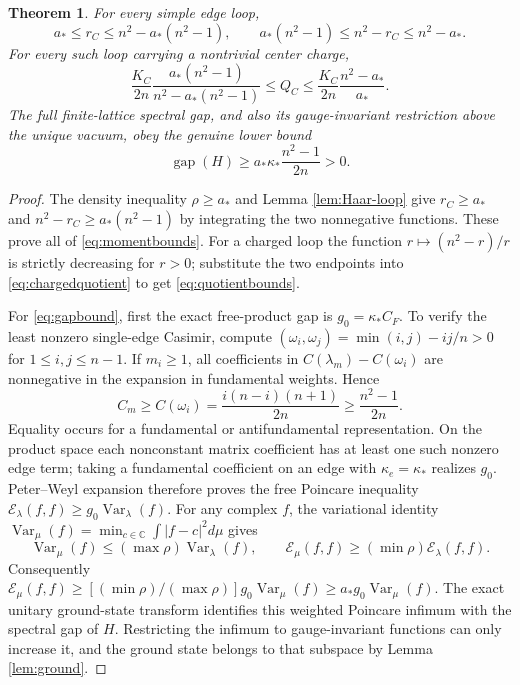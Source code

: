 \documentclass[11pt]{article}
\newtheorem{theorem}{Theorem}
\theoremstyle{definition}
\newcommand{\Var}{\operatorname{Var}}
\begin{document}
\begin{theorem}\label{thm:finite-bounds}
For every simple edge loop,
\begin{equation}\label{eq:momentbounds}
 a_*\leq r_C\leq n^2-a_*(n^2-1),\qquad
 a_*(n^2-1)\leq n^2-r_C\leq n^2-a_*.
\end{equation}
For every such loop carrying a nontrivial center charge,
\begin{equation}\label{eq:quotientbounds}
 \frac{K_C}{2n}\frac{a_*(n^2-1)}{n^2-a_*(n^2-1)}
 \leq Q_C\leq
 \frac{K_C}{2n}\frac{n^2-a_*}{a_*}.
\end{equation}
The full finite-lattice spectral gap, and also its gauge-invariant
restriction above the unique vacuum, obey the genuine lower bound
\begin{equation}\label{eq:gapbound}
 \operatorname{gap}(H)\geq a_*\kappa_*\frac{n^2-1}{2n}>0.
\end{equation}
\end{theorem}
\begin{proof}
The density inequality $\rho\geq a_*$ and Lemma \ref{lem:Haar-loop}
give $r_C\geq a_*$ and
$n^2-r_C\geq a_*(n^2-1)$ by integrating the two nonnegative functions.
These prove all of \eqref{eq:momentbounds}. For a charged loop the
function $r\mapsto(n^2-r)/r$ is strictly decreasing for $r>0$;
substitute the two endpoints into \eqref{eq:chargedquotient} to get
\eqref{eq:quotientbounds}.

For \eqref{eq:gapbound}, first the exact free-product gap is
$g_0=\kappa_*C_F$. To verify the least nonzero single-edge Casimir,
compute
$(\omega_i,\omega_j)=\min(i,j)-ij/n>0$ for $1\leq i,j\leq n-1$.
If $m_i\geq1$, all coefficients in
$C(\lambda_m)-C(\omega_i)$ are nonnegative in the expansion in
fundamental weights. Hence
\[
 C_m\geq C(\omega_i)
 =\frac{i(n-i)(n+1)}{2n}\geq\frac{n^2-1}{2n}.
\]
Equality occurs for a fundamental or antifundamental representation.
On the product space each nonconstant matrix coefficient has at least
one such nonzero edge term; taking a fundamental coefficient on an
edge with $\kappa_e=\kappa_*$ realizes $g_0$. Peter--Weyl expansion
therefore proves the free Poincare inequality
$\mathcal E_\lambda(f,f)\geq g_0\Var_\lambda(f)$.
For any complex $f$, the variational identity
$\Var_\mu(f)=\min_{c\in\mathbb C}\int|f-c|^2d\mu$ gives
\[
 \Var_\mu(f)\leq(\max\rho)\Var_\lambda(f),\qquad
 \mathcal E_\mu(f,f)\geq(\min\rho)\mathcal E_\lambda(f,f).
\]
Consequently
$\mathcal E_\mu(f,f)\geq[(\min\rho)/(\max\rho)]g_0\Var_\mu(f)
\geq a_*g_0\Var_\mu(f)$.
The exact unitary ground-state transform identifies this weighted
Poincare infimum with the spectral gap of $H$. Restricting the infimum
to gauge-invariant functions can only increase it, and the ground
state belongs to that subspace by Lemma \ref{lem:ground}.
\end{proof}
\end{document}
